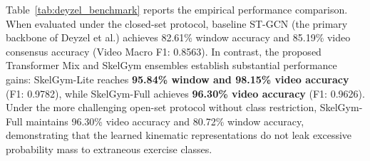 \documentclass[preprint,12pt]{elsarticle}
\begin{document}
Table~\ref{tab:deyzel_benchmark} reports the empirical performance comparison. When evaluated under the closed-set protocol, baseline ST-GCN \cite{yan2018} (the primary backbone of Deyzel et al.) achieves 82.61\% window accuracy and 85.19\% video consensus accuracy (Video Macro F1: 0.8563). In contrast, the proposed Transformer Mix and SkelGym ensembles establish substantial performance gains: SkelGym-Lite reaches \textbf{95.84\% window and 98.15\% video accuracy} (F1: 0.9782), while SkelGym-Full achieves \textbf{96.30\% video accuracy} (F1: 0.9626). Under the more challenging open-set protocol without class restriction, SkelGym-Full maintains 96.30\% video accuracy and 80.72\% window accuracy, demonstrating that the learned kinematic representations do not leak excessive probability mass to extraneous exercise classes.

\begin{table}[!t]
\centering
\caption{Comparative evaluation across the four overlapping Strength \& Conditioning (S\&C) exercises inspired by Deyzel et al. \cite{deyzel2023} (\textit{squat}, \textit{deadlift}, \textit{barbell biceps curl}, \textit{lateral raise}) over 54 held-out test videos ($N=529$ windows).}
\label{tab:deyzel_benchmark}
\end{table}
\end{document}
